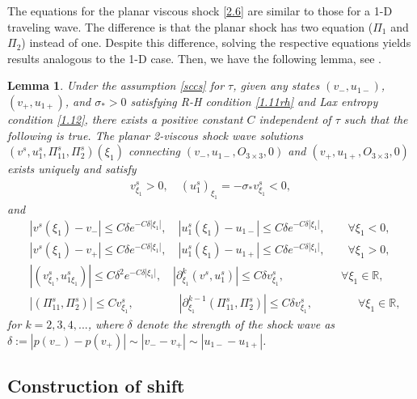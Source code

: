 \documentclass[10pt,reqno]{amsart}
\numberwithin{equation}{section}
\newtheorem{lemma}[theorem]{Lemma}
\begin{document}
The equations for the planar viscous shock \eqref{2.6} are similar to those for a 1-D traveling wave. The difference is that the planar shock has two equation ($\Pi_1$ and $\Pi_2$) instead of one. Despite this difference, solving the respective equations yields results analogous to the 1-D case. Then, we have the following lemma, see \cite{GHSR, GHSS}.

\begin{lemma}\label{pvsw}
Under the assumption \eqref{sccs} for $\tau$, given any states $(v_-,u_{1-})$, $(v_+,u_{1+})$, and $\sigma_\ast>0$ satisfying R-H condition \eqref{1.11rh} and Lax  entropy condition \eqref{1.12}, there exists a positive constant $C$ independent of $\tau$ such that the following is true. The planar 2-viscous shock wave solutions $(v^s,u_{1}^s,\Pi_{11}^s,\Pi_2^s)(\xi_1)$ connecting $(v_-, u_{1-}, O_{3\times3}, 0)$ and $(v_+, u_{1+}, O_{3\times3}, 0)$ exists uniquely and satisfy
\begin{align*}
v^s_{\xi_1}>0,\quad
(u_1^s)_{\xi_1}=-\sigma_\ast v^s_{\xi_1}<0,
\end{align*}
and
\begin{align*}
&|v^s(\xi_1)-v_-|\leq C\delta e^{-C\delta|\xi_1|},\quad
|u_1^s(\xi_1)-u_{1-}|\leq C\delta e^{-C\delta|\xi_1|},\qquad  \forall \xi_1<0,\\
&|v^s(\xi_1)-v_+|\leq C\delta e^{-C\delta|\xi_1|},\quad
|u_1^s(\xi_1)-u_{1+}|\leq C\delta e^{-C\delta|\xi_1|},\qquad  \forall \xi_1>0,\\
&|(v^s_{\xi_1},u^s_{1\xi_1})|\le C\delta^2e^{-C\delta|\xi_1|},\quad
|\partial_{\xi_1}^{k}(v^s, u_1^s)| \le C\delta v^s_{\xi_1},\quad\quad\qquad\quad
\forall \xi_1\in\mathbb{R},\\
&|(\Pi^s_{11}, \Pi^s_2)|\le Cv^s_{\xi_1},\qquad\qquad
|\partial^{k-1}_{\xi_1}(\Pi^s_{11}, \Pi^s_2)|\le C\delta v^s_{\xi_1},
\qquad\quad\quad\forall\xi_1\in\mathbb{R},
\end{align*}
for $k=2,3,4,...$, where $\delta$ denote the strength of the shock wave as $\delta:=|p(v_-)-p(v_+)|\sim|v_--v_+|\sim|u_{1-}-u_{1+}|$.
\end{lemma}

\subsection{Construction of shift}
\end{document}
